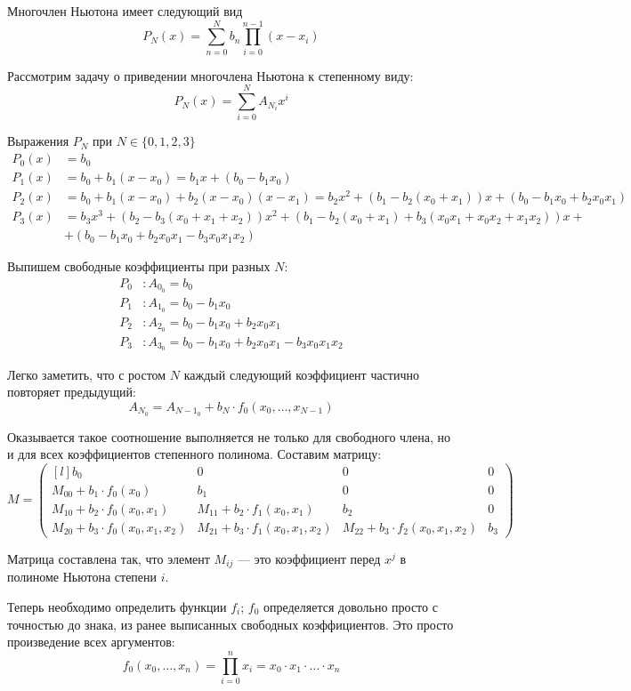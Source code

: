 \documentclass[fleqn]{article}
\begin{document}
Многочлен Ньютона имеет следующий вид
\[ P_N(x) = \sum_{n = 0}^N b_n \prod_{i = 0}^{n-1} (x - x_i) \]

Рассмотрим задачу о приведении многочлена Ньютона к степенному виду:
\[ P_N(x) = \sum_{i = 0}^N A_{N_i} x^i \]

Выражения $P_N$ при $N \in \{0, 1, 2, 3\}$
\begin{align*}
	P_0(x) &= b_0 \\
	P_1(x) &= b_0 + b_1 (x - x_0) = b_1 x + (b_0 - b_1 x_0) \\
	P_2(x) &= b_0 + b_1 (x - x_0) + b_2 (x - x_0)(x - x_1) =
	b_2 x^2 + (b_1 - b_2 (x_0 + x_1)) x + (b_0 - b_1 x_0 + b_2 x_0 x_1) \\
	P_3(x) &= b_3 x^3 + (b_2 - b_3 (x_0 + x_1 + x_2)) x^2
	+ (b_1 - b_2 (x_0 + x_1) + b_3 (x_0 x_1 + x_0 x_2 + x_1 x_2)) x + \\
	&+ (b_0 - b_1 x_0 + b_2 x_0 x_1 - b_3 x_0 x_1 x_2)
\end{align*}


Выпишем свободные коэффициенты при разных $N$:
\begin{align*}
	P_0 &: A_{0_0} = b_0 \\
	P_1 &: A_{1_0} = b_0 - b_1 x_0 \\
	P_2 &: A_{2_0} = b_0 - b_1 x_0 + b_2 x_0 x_1 \\
	P_3 &: A_{3_0} = b_0 - b_1 x_0 + b_2 x_0 x_1 - b_3 x_0 x_1 x_2
\end{align*}

Легко заметить, что с ростом $N$ каждый следующий коэффициент частично
повторяет предыдущий:
\[ A_{N_0} = A_{N-1_0} + b_N \cdot f_0(x_0, \ldots , x_{N-1}) \]

Оказывается такое соотношение выполняется не только для свободного члена,
но и для всех коэффициентов степенного полинома. Составим матрицу:
\[
	M = 
\begin{pmatrix*}[l]
	b_0 & 0 & 0 & 0\\
	M_{00} + b_1 \cdot f_0 (x_0) & b_1 & 0 & 0\\
	M_{10} + b_2 \cdot f_0 (x_0, x_1) & M_{11} + b_2 \cdot f_1(x_0, x_1) & b_2 & 0\\
	M_{20} + b_3 \cdot f_0 (x_0, x_1, x_2) & M_{21} + b_3 \cdot f_1(x_0, x_1, x_2) &
		M_{22} + b_3 \cdot f_2(x_0, x_1, x_2) & b_3
\end{pmatrix*}
\]

Матрица составлена так, что элемент $M_{ij}$ --- это коэффициент перед $x^j$
в полиноме Ньютона степени $i$.

Теперь необходимо определить функции $f_i$; $f_0$ определяется довольно просто с точностью
до знака, из ранее выписанных свободных коэффициентов. Это просто произведение всех аргументов:
\[f_0(x_0, \ldots , x_n) = \prod_{i = 0}^n x_i = x_0 \cdot x_1 \cdot \ldots \cdot x_n\]
\end{document}

